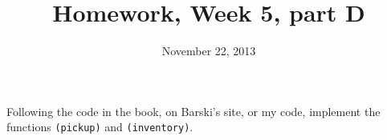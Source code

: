 \documentclass{article}
\title{Homework, Week 5, part D}
\date{November 22, 2013}
\begin{document}
\maketitle{}

\paragraph{}Following the code in the book, on Barski's site, or my code, implement the functions \texttt{(pickup)} and \texttt{(inventory)}.
\end{document}
